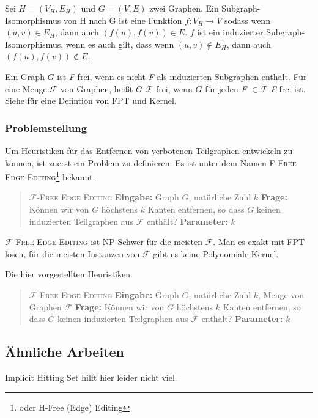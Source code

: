 \documentclass[12pt,a4paper,onecolumn,oneside,titlepage]{article}
\newcommand\cursive[1]{\ensuremath{\mathcal{#1}}}
\begin{document}
Sei $H = (V_H,E_H)$ und $G =(V,E)$ zwei Graphen. Ein Subgraph-Isomorphismus von H nach G ist eine Funktion $f : V_H \rightarrow V$ sodass wenn $(u,v) \in E_H $, dann auch $(f(u),f(v)) \in E$. $f$ ist ein induzierter Subgraph-Isomorphismus, wenn es auch gilt, dass wenn $(u,v) \notin E_H$, dann auch $(f(u),f(v)) \notin E$.

Ein Graph $G$ ist \textit{F}-frei, wenn es nicht \textit{F} als induzierten Subgraphen enthält.
Für eine Menge \cursive{F} von Graphen, heißt $G$ \cursive{F}-frei, wenn $G$ für jeden \textit{F} $\in \cursive{F}$ \textit{F}-frei ist.
Siehe \cite{Cai96} für eine Defintion von FPT und Kernel.

\subsubsection{Problemstellung}
Um Heuristiken für das Entfernen von verbotenen Teilgraphen entwickeln zu können, ist zuerst ein Problem zu definieren. Es ist unter dem Namen \textsc{F-Free Edge Editing}\footnote{oder H-Free (Edge) Editing} bekannt.
\begin{quote}
  \textsc{\cursive{F}-Free Edge Editing}\newline
  \textbf{Eingabe:} Graph $G$, natürliche Zahl $k$\newline
  \textbf{Frage:} Können wir von $G$ höchstens $k$ Kanten entfernen, so dass $G$ keinen induzierten Teilgraphen aus \cursive{F} enthält?\newline
  \textbf{Parameter:} $k$
\end{quote}
\textsc{\cursive{F}-Free Edge Editing} ist NP-Schwer für die meisten \cursive{F}. Man es exakt mit FPT lösen\cite{Cai96}, für die meisten Instanzen von \cursive{F} gibt es keine Polynomiale Kernel.


Die hier vorgestellten Heuristiken.
\begin{quote}
  \textsc{\cursive{F}-Free Edge Editing}\newline
  \textbf{Eingabe:} Graph $G$, natürliche Zahl $k$, Menge von Graphen \cursive{F}\newline
  \textbf{Frage:} Können wir von $G$ höchstens $k$ Kanten entfernen, so dass $G$ keinen induzierten Teilgraphen aus \cursive{F} enthält?\newline
  \textbf{Parameter:} $k$
\end{quote}


\subsection{Ähnliche Arbeiten}
Implicit Hitting Set hilft hier leider nicht viel.\cite{Moreno13} 
\end{document}
